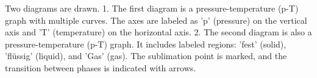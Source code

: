 Two diagrams are drawn.  
1. The first diagram is a pressure-temperature (p-T) graph with multiple curves. The axes are labeled as 'p' (pressure) on the vertical axis and 'T' (temperature) on the horizontal axis.  
2. The second diagram is also a pressure-temperature (p-T) graph. It includes labeled regions: 'fest' (solid), 'flüssig' (liquid), and 'Gas' (gas). The sublimation point is marked, and the transition between phases is indicated with arrows.